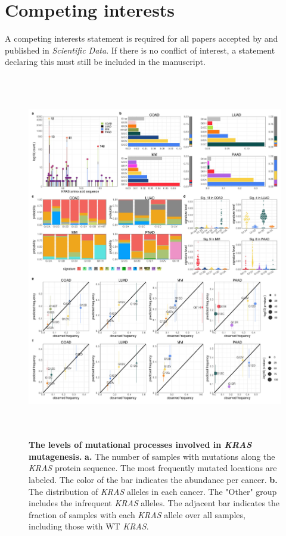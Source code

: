 \documentclass[english, 12pt, letterpaper]{article}
\newcommand{\KRAS}{\emph{KRAS}}
\begin{document}
\section*{Competing interests}

A competing interests statement is required for all papers accepted by and published in \emph{Scientific Data}. If there is no conflict of interest, a statement declaring this must still be included in the manuscript.



{}



\begin{figure}[p]
\centering
\includegraphics[height=160mm]{figures/Figure_01.jpeg}
\caption{
    \textbf{The levels of mutational processes involved in \KRAS{} mutagenesis.}
    \textbf{a.} The number of samples with mutations along the \KRAS{} protein sequence. The most frequently mutated locations are labeled. The color of the bar indicates the abundance per cancer. 
    \textbf{b.} The distribution of \KRAS{} alleles in each cancer. The "Other" group includes the infrequent \KRAS{} alleles. The adjacent bar indicates the fraction of samples with each \KRAS{} allele over all samples, including those with WT \KRAS{}.
}
\end{figure}
\end{document}
